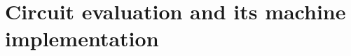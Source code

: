 \chapter{Circuit evaluation and its machine implementation}
\label{chapter:circuit-evaluation}







